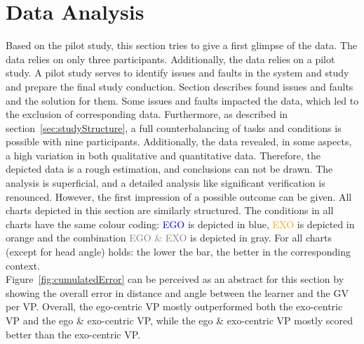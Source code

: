 \section{Data Analysis}
Based on the pilot study, this section tries to give a first glimpse of the data. The data relies on only three participants. Additionally, the data relies on a pilot study. A pilot study serves to identify issues and faults in the system and study and prepare the final study conduction. Section describes found issues and faults and the solution for them. Some issues and faults impacted the data, which led to the exclusion of corresponding data. Furthermore, as described in section~\ref{sec:studyStructure}, a full counterbalancing of tasks and conditions is possible with nine participants. Additionally, the data revealed, in some aspects, a high variation in both qualitative and quantitative data. Therefore, the depicted data is a rough estimation, and conclusions can not be drawn. The analysis is superficial, and a detailed analysis like significant verification is renounced. However, the first impression of a possible outcome can be given. All charts depicted in this section are similarly structured. The conditions in all charts have the same colour coding: \textcolor{blue}{EGO} is depicted in blue, \textcolor{orange}{EXO} is depicted in orange and the combination \textcolor{gray}{EGO \& EXO} is depicted in gray. For all charts (except for head angle) holds: the lower the bar, the better in the corresponding context.\\
Figure~\ref{fig:cumulatedError} can be perceived as an abstract for this section by showing the overall error in distance and angle between the learner and the GV per VP. Overall, the ego-centric VP mostly outperformed both the exo-centric VP and the ego \& exo-centric VP, while the ego \& exo-centric VP mostly scored better than the exo-centric VP.
